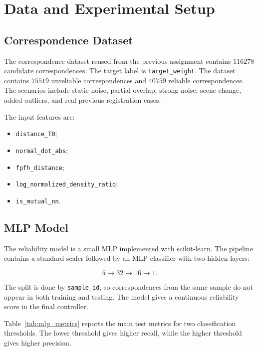 \documentclass[conference]{IEEEtran}
\begin{document}
\section{Data and Experimental Setup}
\label{sec:experimental_setup}

\subsection{Correspondence Dataset}
\label{subsec:dataset}

The correspondence dataset reused from the previous assignment contains $116278$ candidate correspondences. The target label is \texttt{target\_weight}. The dataset contains $75519$ unreliable correspondences and $40759$ reliable correspondences. The scenarios include static noise, partial overlap, strong noise, scene change, added outliers, and real previous registration cases.

The input features are:
\begin{itemize}
    \item \texttt{distance\_T0};
    \item \texttt{normal\_dot\_abs};
    \item \texttt{fpfh\_distance};
    \item \texttt{log\_normalized\_density\_ratio};
    \item \texttt{is\_mutual\_nn}.
\end{itemize}

\subsection{MLP Model}
\label{subsec:mlp_model}

The reliability model is a small MLP implemented with scikit-learn. The pipeline contains a standard scaler followed by an MLP classifier with two hidden layers:

\begin{equation}
    5 \rightarrow 32 \rightarrow 16 \rightarrow 1.
\end{equation}

The split is done by \texttt{sample\_id}, so correspondences from the same sample do not appear in both training and testing. The model gives a continuous reliability score in the final controller.

Table~\ref{tab:mlp_metrics} reports the main test metrics for two classification thresholds. The lower threshold gives higher recall, while the higher threshold gives higher precision.
\end{document}
